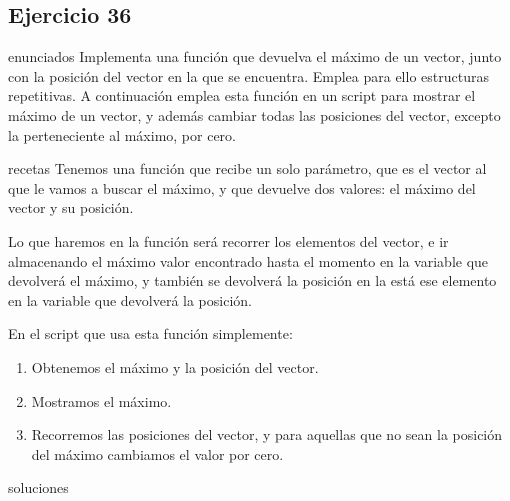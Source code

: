 \subsection{Ejercicio 36}
\def\parte{enunciados}
\ifx\capitulo\parte
Implementa una función que devuelva el máximo de un vector, junto con la posición del vector en la que se encuentra. Emplea para ello estructuras repetitivas.
A continuación emplea esta función en un script para mostrar el máximo de un vector, y además cambiar todas las posiciones del vector, excepto la perteneciente al máximo, por cero.
\fi

\def\parte{recetas}
\ifx\capitulo\parte
Tenemos una función que recibe un solo parámetro, que es el vector al que le vamos a buscar el máximo, y que devuelve dos valores: el máximo del vector y su posición.

Lo que haremos en la función será recorrer los elementos del vector, e ir almacenando el máximo valor encontrado hasta el momento en la variable que devolverá el máximo, y también se devolverá la posición en la está ese elemento en la variable que devolverá la posición.

En el script que usa esta función simplemente:

\begin{enumerate}
\item Obtenemos el máximo y la posición del vector.
\item Mostramos el máximo.
\item Recorremos las posiciones del vector, y para aquellas que no sean la posición del máximo cambiamos el valor por cero. 
\end{enumerate}
\fi

\def\parte{soluciones}
\ifx\capitulo\parte


\fi

